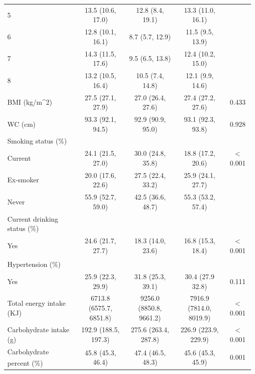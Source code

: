 \begin{table}
\begin{tabular}[t]{lcccc}
		\hspace{1em}5 & 13.5 (10.6, 17.0) & 12.8 (8.4, 19.1) & 13.3 (11.0, 16.1) & \\
		\hspace{1em}6 & 12.8 (10.1, 16.1) & 8.7 (5.7, 12.9) & 11.5 (9.5, 13.9) & \\
		\hspace{1em}7 & 14.3 (11.5, 17.6) & 9.5 (6.5, 13.8) & 12.4 (10.2, 15.0) & \\
		\hspace{1em}8 & 13.2 (10.5, 16.4) & 10.5 (7.4, 14.8) & 12.1 (9.9, 14.6) & \\
		BMI (kg/m\textasciicircum{}2) & 27.5 (27.1, 27.9) & 27.0 (26.4, 27.6) & 27.4 (27.2, 27.6) & 0.433\\
		WC (cm) & 93.3 (92.1, 94.5) & 92.9 (90.9, 95.0) & 93.1 (92.3, 93.8) & 0.928\\
		Smoking status (\%) &  &  &  & \\
		\hspace{1em}Current & 24.1 (21.5, 27.0) & 30.0 (24.8, 35.8) & 18.8 (17.2, 20.6) & < 0.001\\
		\hspace{1em}Ex-smoker & 20.0 (17.6, 22.6) & 27.5 (22.4, 33.2) & 25.9 (24.1, 27.7) & \\
		\hspace{1em}Never & 55.9 (52.7, 59.0) & 42.5 (36.6, 48.7) & 55.3 (53.2, 57.4) & \\
		Current drinking status (\%) &  &  &  & \\
		\hspace{1em}Yes & 24.6 (21.7, 27.7) & 18.3 (14.0, 23.6) & 16.8 (15.3, 18.4) & < 0.001\\
		Hypertension (\%) \textsuperscript{\dag} &  &  &  & \\
		\hspace{1em}Yes & 25.9 (22.3, 29.9) & 31.8 (25.3, 39.1) & 30.4 (27.9 32.8) & 0.111\\
		Total energy intake (KJ) &  \Centerstack{ 6713.8 \\ (6575.7, 6851.8)}   &  \Centerstack{ 9256.0 \\ (8850.8, 9661.2)}   &  \Centerstack{7916.9 \\ (7814.0, 8019.9)}     & < 0.001\\
		Carbohydrate intake (g) & 192.9 (188.5, 197.3) & 275.6 (263.4, 287.8) & 226.9 (223.9, 229.9) & < 0.001\\
		Carbohydrate
		percent (\%) \textsuperscript{\ddag} & 45.8 (45.3, 46.4) & 47.4 (46.5, 48.3) & 45.6 (45.3, 45.9) & 0.001\\

\end{tabular}
\end{table}
